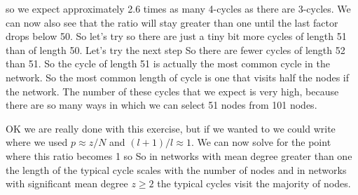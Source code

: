 so we expect approximately 2.6 times as many 4-cycles as there are 3-cycles. We can now also see that the ratio will stay greater than one until the last factor drops below 50. So let's try 
so there are just a tiny bit more cycles of length 51 than of length 50. Let's try the next step
So there are fewer cycles of length 52 than 51. So the cycle of length 51 is actually the most common cycle in the network. So the most common length of cycle is one that visits half the nodes if the network. The number of these cycles that we expect is very high, because there are so many ways in which we can select 51 nodes from 101 nodes.  

OK we are really done with this exercise, but if we wanted to we could write
where we used $p\approx z/N$ and $(l+1)/l \approx 1$. We can now solve for the point where this ratio becomes 1
so 
So in networks with mean degree greater than one the length of the typical cycle scales with the number of nodes and in networks with significant mean degree $z\geq 2$ the typical cycles visit the majority of nodes. 
